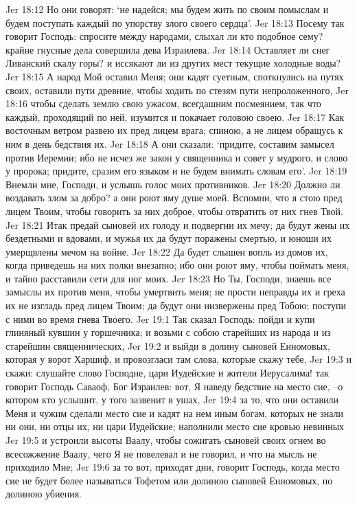 Jer 18:12  Но они говорят: `не надейся; мы будем жить по своим помыслам и будем поступать каждый по упорству злого своего сердца'.
Jer 18:13  Посему так говорит Господь: спросите между народами, слыхал ли кто подобное сему? крайне гнусные дела совершила дева Израилева.
Jer 18:14  Оставляет ли снег Ливанский скалу горы? и иссякают ли из других мест текущие холодные воды?
Jer 18:15  А народ Мой оставил Меня; они кадят суетным, споткнулись на путях своих, оставили пути древние, чтобы ходить по стезям пути непроложенного,
Jer 18:16  чтобы сделать землю свою ужасом, всегдашним посмеянием, так что каждый, проходящий по ней, изумится и покачает головою своею.
Jer 18:17  Как восточным ветром развею их пред лицем врага; спиною, а не лицем обращусь к ним в день бедствия их.
Jer 18:18  А они сказали: `придите, составим замысел против Иеремии; ибо не исчез же закон у священника и совет у мудрого, и слово у пророка; придите, сразим его языком и не будем внимать словам его'.
Jer 18:19  Внемли мне, Господи, и услышь голос моих противников.
Jer 18:20  Должно ли воздавать злом за добро? а они роют яму душе моей. Вспомни, что я стою пред лицем Твоим, чтобы говорить за них доброе, чтобы отвратить от них гнев Твой.
Jer 18:21  Итак предай сыновей их голоду и подвергни их мечу; да будут жены их бездетными и вдовами, и мужья их да будут поражены смертью, и юноши их умерщвлены мечом на войне.
Jer 18:22  Да будет слышен вопль из домов их, когда приведешь на них полки внезапно; ибо они роют яму, чтобы поймать меня, и тайно расставили сети для ног моих.
Jer 18:23  Но Ты, Господи, знаешь все замыслы их против меня, чтобы умертвить меня; не прости неправды их и греха их не изгладь пред лицем Твоим; да будут они низвержены пред Тобою; поступи с ними во время гнева Твоего.
Jer 19:1  Так сказал Господь: пойди и купи глиняный кувшин у горшечника; и возьми с собою старейших из народа и из старейшин священнических,
Jer 19:2  и выйди в долину сыновей Енномовых, которая у ворот Харшиф, и провозгласи там слова, которые скажу тебе,
Jer 19:3  и скажи: слушайте слово Господне, цари Иудейские и жители Иерусалима! так говорит Господь Саваоф, Бог Израилев: вот, Я наведу бедствие на место сие, --о котором кто услышит, у того зазвенит в ушах,
Jer 19:4  за то, что они оставили Меня и чужим сделали место сие и кадят на нем иным богам, которых не знали ни они, ни отцы их, ни цари Иудейские; наполнили место сие кровью невинных
Jer 19:5  и устроили высоты Ваалу, чтобы сожигать сыновей своих огнем во всесожжение Ваалу, чего Я не повелевал и не говорил, и что на мысль не приходило Мне;
Jer 19:6  за то вот, приходят дни, говорит Господь, когда место сие не будет более называться Тофетом или долиною сыновей Енномовых, но долиною убиения.
